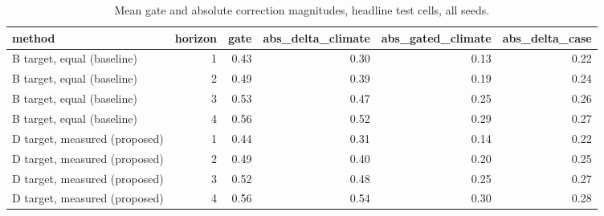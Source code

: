 \begin{table}[t]
\centering
\small
\caption{Mean gate and absolute correction magnitudes, headline test cells, all seeds.}
\label{tab:gates-and-corrections}
\begin{tabular}{lrrrrr}
\toprule
method & horizon & gate & abs\_delta\_climate & abs\_gated\_climate & abs\_delta\_case \\
\midrule
B target, equal (baseline) & 1 & 0.43 & 0.30 & 0.13 & 0.22 \\
B target, equal (baseline) & 2 & 0.49 & 0.39 & 0.19 & 0.24 \\
B target, equal (baseline) & 3 & 0.53 & 0.47 & 0.25 & 0.26 \\
B target, equal (baseline) & 4 & 0.56 & 0.52 & 0.29 & 0.27 \\
D target, measured (proposed) & 1 & 0.44 & 0.31 & 0.14 & 0.22 \\
D target, measured (proposed) & 2 & 0.49 & 0.40 & 0.20 & 0.25 \\
D target, measured (proposed) & 3 & 0.52 & 0.48 & 0.25 & 0.27 \\
D target, measured (proposed) & 4 & 0.56 & 0.54 & 0.30 & 0.28 \\
\bottomrule
\end{tabular}
\end{table}
